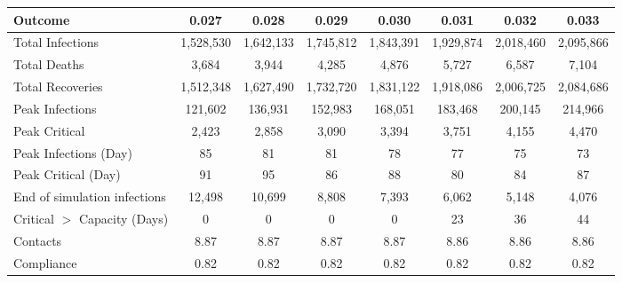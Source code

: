 \begin{table}[ht]
\centering
\begin{tabular}{lccccccc}
  \hline
Outcome & 0.027 & 0.028 & 0.029 & 0.030 & 0.031 & 0.032 & 0.033 \\ 
  \hline
Total Infections & 1,528,530 & 1,642,133 & 1,745,812 & 1,843,391 & 1,929,874 & 2,018,460 & 2,095,866 \\ 
  Total Deaths &     3,684 &     3,944 &     4,285 &     4,876 &     5,727 &     6,587 &     7,104 \\ 
  Total Recoveries & 1,512,348 & 1,627,490 & 1,732,720 & 1,831,122 & 1,918,086 & 2,006,725 & 2,084,686 \\ 
  Peak Infections &   121,602 &   136,931 &   152,983 &   168,051 &   183,468 &   200,145 &   214,966 \\ 
  Peak Critical &     2,423 &     2,858 &     3,090 &     3,394 &     3,751 &     4,155 &     4,470 \\ 
  Peak Infections (Day) &        85 &        81 &        81 &        78 &        77 &        75 &        73 \\ 
  Peak Critical (Day) &        91 &        95 &        86 &        88 &        80 &        84 &        87 \\ 
  End of simulation infections &    12,498 &    10,699 &     8,808 &     7,393 &     6,062 &     5,148 &     4,076 \\ 
  Critical $>$ Capacity (Days) &         0 &         0 &         0 &         0 &        23 &        36 &        44 \\ 
  Contacts &      8.87 &      8.87 &      8.87 &      8.87 &      8.86 &      8.86 &      8.86 \\ 
  Compliance &      0.82 &      0.82 &      0.82 &      0.82 &      0.82 &      0.82 &      0.82 \\ 
   \hline
\end{tabular}
\end{table}
